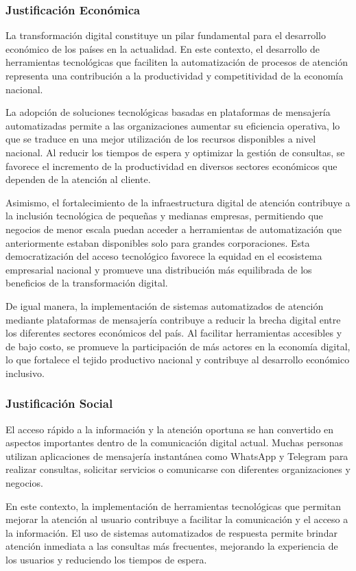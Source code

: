 \subsubsection{Justificación Económica}
La transformación digital constituye un pilar fundamental para el desarrollo económico de los países en la actualidad. En este contexto, el desarrollo de herramientas tecnológicas que faciliten la automatización de procesos de atención representa una contribución a la productividad y competitividad de la economía nacional.

La adopción de soluciones tecnológicas basadas en plataformas de mensajería automatizadas permite a las organizaciones aumentar su eficiencia operativa, lo que se traduce en una mejor utilización de los recursos disponibles a nivel nacional. Al reducir los tiempos de espera y optimizar la gestión de consultas, se favorece el incremento de la productividad en diversos sectores económicos que dependen de la atención al cliente.

Asimismo, el fortalecimiento de la infraestructura digital de atención contribuye a la inclusión tecnológica de pequeñas y medianas empresas, permitiendo que negocios de menor escala puedan acceder a herramientas de automatización que anteriormente estaban disponibles solo para grandes corporaciones. Esta democratización del acceso tecnológico favorece la equidad en el ecosistema empresarial nacional y promueve una distribución más equilibrada de los beneficios de la transformación digital.

De igual manera, la implementación de sistemas automatizados de atención mediante plataformas de mensajería contribuye a reducir la brecha digital entre los diferentes sectores económicos del país. Al facilitar herramientas accesibles y de bajo costo, se promueve la participación de más actores en la economía digital, lo que fortalece el tejido productivo nacional y contribuye al desarrollo económico inclusivo.
\subsubsection{Justificación Social }
El acceso rápido a la información y la atención oportuna se han convertido en aspectos importantes dentro de la comunicación digital actual. Muchas personas utilizan aplicaciones de mensajería instantánea como WhatsApp y Telegram para realizar consultas, solicitar servicios o comunicarse con diferentes organizaciones y negocios.

En este contexto, la implementación de herramientas tecnológicas que permitan mejorar la atención al usuario contribuye a facilitar la comunicación y el acceso a la información. El uso de sistemas automatizados de respuesta permite brindar atención inmediata a las consultas más frecuentes, mejorando la experiencia de los usuarios y reduciendo los tiempos de espera.

